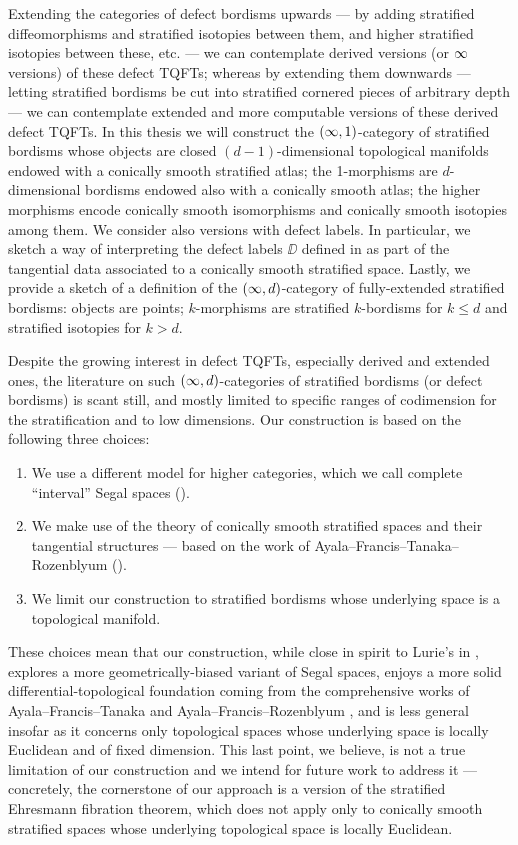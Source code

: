 Extending the categories of defect bordisms upwards — by adding stratified diffeomorphisms and stratified isotopies between them, and higher stratified isotopies between these, etc. — we can contemplate derived versions (or $\operatorname{\infty}$ versions) of these defect TQFTs; whereas by extending them downwards — letting stratified bordisms be cut into stratified cornered pieces of arbitrary depth — we can contemplate extended and more computable versions of these derived defect TQFTs. In this thesis we will construct the $(\operatorname{\infty},1)$-category of stratified bordisms whose objects are closed $(d-1)$-dimensional topological manifolds endowed with a conically smooth stratified atlas; the 1-morphisms are $d$-dimensional bordisms endowed also with a conically smooth atlas; the higher morphisms encode conically smooth isomorphisms and conically smooth isotopies among them. We consider also versions with defect labels. In particular, we sketch a way of interpreting the defect labels $\DD$ defined in \cite[Definition~2.4]{CRS19} as part of the tangential data associated to a conically smooth stratified space. Lastly, we provide a sketch of a definition of the $(\operatorname{\infty},d)$-category of fully-extended stratified bordisms: objects are points; $k$-morphisms are stratified $k$-bordisms for $k\leq d$ and stratified isotopies for $k > d$.     


Despite the growing interest in defect TQFTs, especially derived and extended ones, the literature on such $(\operatorname{\infty},d)$-categories of stratified bordisms (or defect bordisms) is scant still, and mostly limited to specific ranges of codimension for the stratification and to low dimensions. Our construction is based on the following three choices:
\begin{enumerate}
\item We use a different model for higher categories, which we call complete ``interval'' Segal spaces ().
\item We make use of the theory of conically smooth stratified spaces and their tangential structures — based on the work of Ayala--Francis--Tanaka--Rozenblyum ().
\item We limit our construction to stratified bordisms whose underlying space is a topological manifold.
\end{enumerate}
These choices mean that our construction, while close in spirit to Lurie's in \cite[Definition~4.11]{Lur09}, explores a more geometrically-biased variant of Segal spaces, enjoys a more solid differential-topological foundation coming from the comprehensive works of Ayala--Francis--Tanaka \cite{AFT1} and Ayala--Francis--Rozenblyum \cite{AFR1}\cite{AFR2}, and is less general insofar as it concerns only topological spaces whose underlying space is locally Euclidean and of fixed dimension. This last point, we believe, is not a true limitation of our construction and we intend for future work to address it — concretely, the cornerstone of our approach is a version of the stratified Ehresmann fibration theorem, which does not apply only to conically smooth stratified spaces whose underlying topological space is locally Euclidean.

